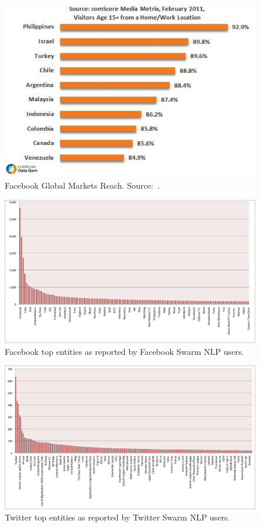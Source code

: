\documentclass{iosart2c}
\begin{document}
\begin{figure}
\centering
\includegraphics[width=1.0\linewidth]{./resources/facebookglobalmarkets.jpg}
\caption{Facebook Global Markets Reach. Source:~\cite{comScoreFacebook}.}
\label{fig:facebookglobalmarkets}
\end{figure}

\begin{figure}
\centering
\includegraphics[width=1.0\linewidth]{./resources/facebooktopentities.png}
\caption{Facebook top entities as reported by Facebook Swarm NLP users.}
\label{fig:facebooktopentities}
\end{figure}

\begin{figure}
\centering
\includegraphics[width=1.0\linewidth]{./resources/twittertopentities.png}
\caption{Twitter top entities as reported by Twitter Swarm NLP users.}
\label{fig:twittertopentities}
\end{figure}
\end{document}

